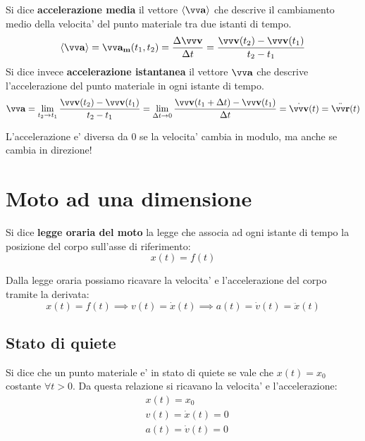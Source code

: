 \begin{definition}
    Si dice \textbf{accelerazione media} il vettore $\ang{\bvv{a}}$ che descrive il cambiamento medio della velocita' del punto materiale tra due istanti di tempo.
    \[\ang{\bvv{a}} = \bvv{a_m}(t_1, t_2) = \frac{\Delta\bvv{v}}{\Delta t} = \frac{\bvv{v}(t_2) - \bvv{v}(t_1)}{t_2-t_1}\] 
    Si dice invece \textbf{accelerazione istantanea} il vettore $\bvv{a}$ che descrive l'accelerazione del punto materiale in ogni istante di tempo.
    \[\bvv{a} = \lim_{t_2 \to t_1} \frac{\bvv{v}(t_2) - \bvv{v}(t_1)}{t_2-t_1} = \lim_{\Delta t \to 0} \frac{\bvv{v}(t_1 + \Delta t) - \bvv{v}(t_1)}{\Delta t} = \dot{\bvv{v}}(t) = \ddot{\bvv{r}}(t)\]
\end{definition}

\theoremstyle{plain}
\begin{remark}
    L'accelerazione e' diversa da 0 se la velocita' cambia in modulo, ma anche se cambia in direzione!
\end{remark}

\section{Moto ad una dimensione}
\theoremstyle{definition}
\begin{definition}
    Si dice \textbf{legge oraria del moto} la legge che associa ad ogni istante di tempo la posizione del corpo
    sull'asse di riferimento:
    \[x(t) = f(t)\]
\end{definition}

Dalla legge oraria possiamo ricavare la velocita' e l'accelerazione del corpo tramite la derivata:
\[x(t) = f(t) \implies v(t) = \dot{x}(t) \implies a(t) = \dot{v}(t) = \ddot{x}(t)\]

\subsection{Stato di quiete}
Si dice che un punto materiale e' in stato di quiete se vale che $x(t) = x_0$ costante $\forall t > 0$.
Da questa relazione si ricavano la velocita' e l'accelerazione:
\begin{subequations}
\begin{align}
    &x(t) = x_0 \\
    &v(t) = \dot{x}(t) = 0 \\
    &a(t) = \dot{v}(t) = 0 
\end{align}
\end{subequations}

